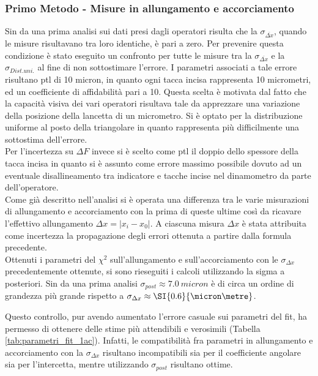 \documentclass[a4paper,11pt,oneside]{article}
\begin{document}
\subsubsection*{Primo Metodo - Misure in allungamento e accorciamento}
Sin da una prima analisi sui dati presi dagli operatori risulta che la $\sigma_{\overline{\Delta x}}$, quando le misure risultavano tra loro identiche, è pari a zero. Per prevenire questa condizione è stato eseguito un confronto per tutte le misure tra la $\sigma_{\overline{\Delta x}}$ e la $\sigma_{Dist. uni.}$ al fine di non sottostimare l'errore. I parametri associati a tale errore risultano ptl di 10 micron, in quanto ogni tacca incisa rappresenta 10 micrometri, ed un coefficiente di affidabilità pari a 10. Questa scelta è motivata dal fatto che la capacità visiva dei vari operatori risultava tale da apprezzare una variazione della posizione della lancetta di un micrometro. Si è optato per la distribuzione uniforme al posto della triangolare in quanto rappresenta più difficilmente una sottostima dell'errore.\\
Per l'incertezza su $\Delta F$ invece si è scelto come ptl il doppio dello spessore della tacca incisa in quanto si è assunto come errore massimo possibile dovuto ad un eventuale disallineamento tra indicatore e tacche incise nel dinamometro da parte dell'operatore.\\

Come già descritto nell'analisi si è operata una differenza tra le varie misurazioni di allungamento e accorciamento con la prima di queste ultime così da ricavare l'effettivo allungamento $\Delta x=| x_{i}-x_{0}|$. A ciascuna misura $\Delta x$ è stata attribuita come incertezza la propagazione degli errori ottenuta a partire dalla formula precedente.\\

Ottenuti i parametri del ${\chi}^2$ sull'allungamento e sull'accorciamento con le $\sigma_{\Delta x}$ precedentemente ottenute, si sono rieseguiti i calcoli utilizzando la sigma a posteriori. Sin da una prima analisi $\sigma_{post} \approx \SI{7.0}{micron}$ è di circa un ordine di grandezza più grande rispetto a $\sigma_{\Delta x} \approx \SI{0.6}{\micron\metre}$.

Questo controllo, pur avendo aumentato l'errore casuale sui parametri del fit, ha permesso di ottenere delle stime più attendibili e verosimili (Tabella \ref{tab:parametri_fit_1ac}). Infatti, le compatibilità fra parametri in allungamento e accorciamento con la $\sigma_{\Delta x}$ risultano incompatibili sia per il coefficiente angolare sia per l'intercetta, mentre utilizzando $\sigma_{post}$ risultano ottime.
\end{document}
